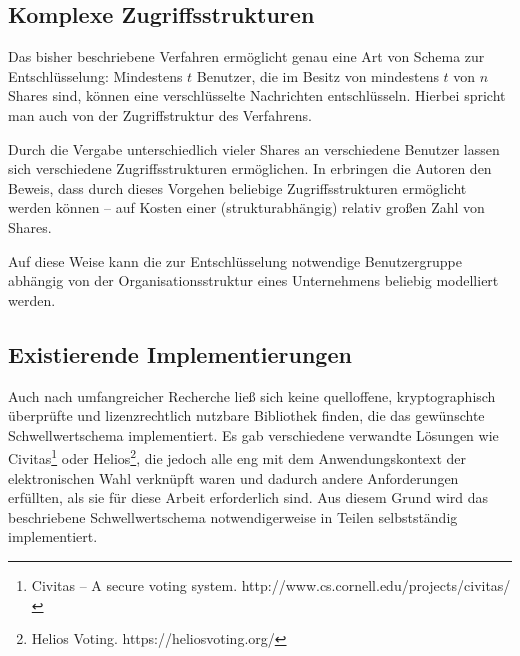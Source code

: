 \subsection{Komplexe Zugriffsstrukturen}
\label{sec_state_threshold_access_structures}

Das bisher beschriebene Verfahren ermöglicht genau eine Art von Schema zur Entschlüsselung: Mindestens \(t\) Benutzer, die im Besitz von mindestens \(t\) von \(n\) Shares sind, können eine verschlüsselte Nachrichten entschlüsseln. Hierbei spricht man auch von der Zugriffstruktur des Verfahrens.

Durch die Vergabe unterschiedlich vieler Shares an verschiedene Benutzer lassen sich verschiedene Zugriffsstrukturen ermöglichen. In \cite{ito1989secret} erbringen die Autoren den Beweis, dass durch dieses Vorgehen beliebige Zugriffsstrukturen ermöglicht werden können -- auf Kosten einer (strukturabhängig) relativ großen Zahl von Shares.

Auf diese Weise kann die zur Entschlüsselung notwendige Benutzergruppe abhängig von der Organisationsstruktur eines Unternehmens beliebig modelliert werden.

\subsection{Existierende Implementierungen}

\label{sec_state_threshold_existing_impl}

Auch nach umfangreicher Recherche ließ sich keine quelloffene, kryptographisch überprüfte und lizenzrechtlich nutzbare Bibliothek finden, die das gewünschte Schwellwertschema implementiert. Es gab verschiedene verwandte Lösungen wie Civitas\footnote{
  Civitas -- A secure voting system. http://www.cs.cornell.edu/projects/civitas/
} oder Helios\footnote{
  Helios Voting. https://heliosvoting.org/
}, die jedoch alle eng mit dem Anwendungskontext der elektronischen Wahl verknüpft waren und dadurch andere Anforderungen erfüllten, als sie für diese Arbeit erforderlich sind. Aus diesem Grund wird das beschriebene Schwellwertschema notwendigerweise in Teilen selbstständig implementiert.